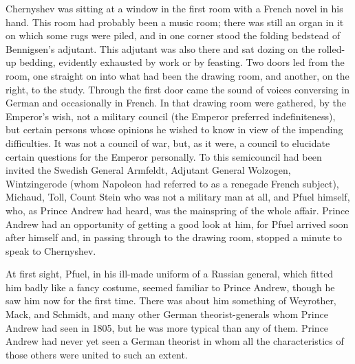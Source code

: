 Chernyshev was sitting at a window in the first room with a
French novel in his hand. This room had probably been a music
room; there was still an organ in it on which some rugs were
piled, and in one corner stood the folding bedstead of
Bennigsen's adjutant. This adjutant was also there and sat dozing
on the rolled-up bedding, evidently exhausted by work or by
feasting. Two doors led from the room, one straight on into what
had been the drawing room, and another, on the right, to the
study.  Through the first door came the sound of voices
conversing in German and occasionally in French. In that drawing
room were gathered, by the Emperor's wish, not a military council
(the Emperor preferred indefiniteness), but certain persons whose
opinions he wished to know in view of the impending
difficulties. It was not a council of war, but, as it were, a
council to elucidate certain questions for the Emperor
personally. To this semicouncil had been invited the Swedish
General Armfeldt, Adjutant General Wolzogen, Wintzingerode (whom
Napoleon had referred to as a renegade French subject), Michaud,
Toll, Count Stein who was not a military man at all, and Pfuel
himself, who, as Prince Andrew had heard, was the mainspring of
the whole affair. Prince Andrew had an opportunity of getting a
good look at him, for Pfuel arrived soon after himself and, in
passing through to the drawing room, stopped a minute to speak to
Chernyshev.

At first sight, Pfuel, in his ill-made uniform of a Russian
general, which fitted him badly like a fancy costume, seemed
familiar to Prince Andrew, though he saw him now for the first
time. There was about him something of Weyrother, Mack, and
Schmidt, and many other German theorist-generals whom Prince
Andrew had seen in 1805, but he was more typical than any of
them. Prince Andrew had never yet seen a German theorist in whom
all the characteristics of those others were united to such an
extent.

